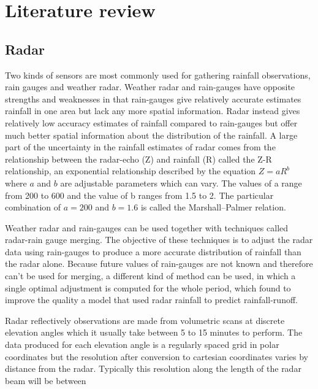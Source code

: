\chapter{Literature review} \label{sec:Literature review}



\section{Radar}
Two kinds of sensors are most commonly used for gathering rainfall observations, rain gauges and weather radar. Weather radar and rain-gauges have opposite strengths and weaknesses in that rain-gauges give relatively accurate estimates rainfall in one area but lack any more spatial information. Radar instead gives relatively low accuracy estimates of rainfall compared to rain-gauges but offer much better spatial information about the distribution of the rainfall. A large part of the uncertainty in the rainfall estimates of radar comes from the relationship between the radar-echo (Z) and rainfall (R) called the Z-R relationship, an exponential relationship described by the equation $Z = aR^b$ where $a$ and $b$ are adjustable parameters which can vary.  The values of a range from 200 to 600 and the value of b ranges from 1.5 to 2. The particular combination of $a = 200$ and $b = 1.6$ is called the Marshall–Palmer relation. 
 

Weather radar and rain-gauges can be used together with techniques called radar-rain gauge merging. The objective of these techniques is to adjust the radar data using rain-gauges to produce a more accurate distribution of rainfall than the radar alone\cite{RN301}. Because future values of rain-gauges are not known and therefore can't be used for merging, a different kind of method can be used, in which a single optimal adjustment is computed for the whole period, which \cite{LOWE2014397} found to improve the quality a model that used radar rainfall to predict rainfall-runoff. 


Radar reflectively observations are made from volumetric scans at discrete elevation angles which it usually take between 5 to 15 minutes to perform. The data produced for each elevation angle is a regularly spaced grid in polar coordinates but the resolution after conversion to cartesian coordinates varies by distance from the radar. Typically this resolution along the length of the radar beam will be between 

